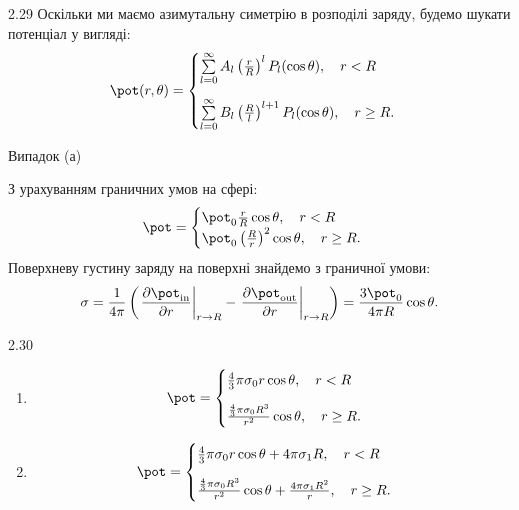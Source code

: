\begin{Solution}{2.{29}}
	Оскільки ми маємо азимутальну симетрію в розподілі заряду, будемо шукати потенціал у вигляді:
	\begin{equation}
		\pot(r, \theta) = \begin{cases}
			\sum\limits_{l=0}^{\infty}A_l \left( \frac{r}{R}\right)^l P_l(\cos\theta), \quad r<R \\[1.5em]
			\sum\limits_{l=0}^{\infty}B_l \left( \frac{R}{l}\right)^{l+1} P_l(\cos\theta), \quad r \ge R.
		\end{cases}
	\end{equation}

	Випадок (а)

	З урахуванням граничних умов на сфері:
	\begin{equation}
		\pot = \begin{cases}
			\pot_0\frac{r}{R} \cos\theta, \quad r<R \\
			\pot_0\left( \frac{R}{r}\right)^2 \cos\theta, \quad r \ge R.
		\end{cases}
	\end{equation}
	Поверхневу густину заряду на поверхні знайдемо з граничної умови:
	\begin{equation}
		\sigma = \frac{1}{4\pi} \left( \left. \frac{\partial \pot_{\mathrm{in}}}{\partial r}\right|_{r \to R} - \left. \frac{\partial \pot_{\mathrm{out}}}{\partial r}\right|_{r \to R} \right) =  \frac{3\pot_0}{4\pi R} \cos\theta.
	\end{equation}
\end{Solution}
\begin{Solution}{2.{30}}
	\begin{enumerate}[label=\alph*)]
		\item%
		      \begin{equation}
			      \pot = \begin{cases}
				      \frac43\pi\sigma_0r \cos\theta, \quad r<R \\[1em]
				      \frac{\frac43\pi\sigma_0R^3}{r^2} \cos\theta, \quad r \ge R.
			      \end{cases}
		      \end{equation}
		\item%
		      \begin{equation}
			      \pot = \begin{cases}
				      \frac43\pi\sigma_0r \cos\theta + 4\pi\sigma_1 R, \quad r<R \\[1em]
				      \frac{\frac43\pi\sigma_0R^3}{r^2} \cos\theta + \frac{4\pi\sigma_1 R^2}{r}, \quad r \ge R.
			      \end{cases}
		      \end{equation}
	\end{enumerate}
\end{Solution}
